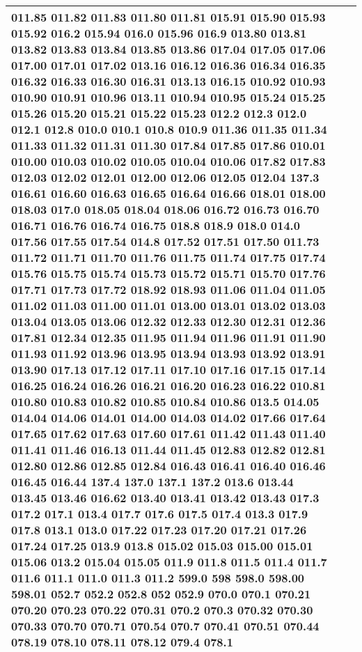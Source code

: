 \begin{longtable}{|R{.05in}|L{.65in}||L{5.65in}|}
011.85 011.82 011.83 011.80 011.81 015.91 015.90 015.93 015.92 016.2 015.94 016.0 015.96 016.9 013.80 013.81 013.82 013.83 013.84 013.85 013.86 017.04 017.05 017.06 017.00 017.01 017.02 013.16 016.12 016.36 016.34 016.35 016.32 016.33 016.30 016.31 013.13 016.15 010.92 010.93 010.90 010.91 010.96 013.11 010.94 010.95 015.24 015.25 015.26 015.20 015.21 015.22 015.23 012.2 012.3 012.0 012.1 012.8 010.0 010.1 010.8 010.9 011.36 011.35 011.34 011.33 011.32 011.31 011.30 017.84 017.85 017.86 010.01 010.00 010.03 010.02 010.05 010.04 010.06 017.82 017.83 012.03 012.02 012.01 012.00 012.06 012.05 012.04 137.3 016.61 016.60 016.63 016.65 016.64 016.66 018.01 018.00 018.03 017.0 018.05 018.04 018.06 016.72 016.73 016.70 016.71 016.76 016.74 016.75 018.8 018.9 018.0 014.0 017.56 017.55 017.54 014.8 017.52 017.51 017.50 011.73 011.72 011.71 011.70 011.76 011.75 011.74 017.75 017.74 015.76 015.75 015.74 015.73 015.72 015.71 015.70 017.76 017.71 017.73 017.72 018.92 018.93 011.06 011.04 011.05 011.02 011.03 011.00 011.01 013.00 013.01 013.02 013.03 013.04 013.05 013.06 012.32 012.33 012.30 012.31 012.36 017.81 012.34 012.35 011.95 011.94 011.96 011.91 011.90 011.93 011.92 013.96 013.95 013.94 013.93 013.92 013.91 013.90 017.13 017.12 017.11 017.10 017.16 017.15 017.14 016.25 016.24 016.26 016.21 016.20 016.23 016.22 010.81 010.80 010.83 010.82 010.85 010.84 010.86 013.5 014.05 014.04 014.06 014.01 014.00 014.03 014.02 017.66 017.64 017.65 017.62 017.63 017.60 017.61 011.42 011.43 011.40 011.41 011.46 016.13 011.44 011.45 012.83 012.82 012.81 012.80 012.86 012.85 012.84 016.43 016.41 016.40 016.46 016.45 016.44 137.4 137.0 137.1 137.2 013.6 013.44 013.45 013.46 016.62 013.40 013.41 013.42 013.43 017.3 017.2 017.1 013.4 017.7 017.6 017.5 017.4 013.3 017.9 017.8 013.1 013.0 017.22 017.23 017.20 017.21 017.26 017.24 017.25 013.9 013.8 015.02 015.03 015.00 015.01 015.06 013.2 015.04 015.05 011.9 011.8 011.5 011.4 011.7 011.6 011.1 011.0 011.3 011.2 599.0 598 598.0 598.00 598.01 052.7 052.2 052.8 052 052.9 070.0 070.1 070.21 070.20 070.23 070.22 070.31 070.2 070.3 070.32 070.30 070.33 070.70 070.71 070.54 070.7 070.41 070.51 070.44 078.19 078.10 078.11 078.12 079.4 078.1
  \\\hline

\end{longtable}
